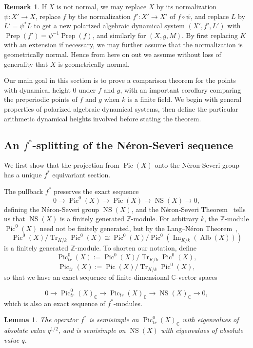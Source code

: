 \documentclass[times, doublespace]{amsart}
\numberwithin{equation}{section}
\theoremstyle{plain}
\newtheorem{lemma}[equation]{Lemma}
\theoremstyle{definition}
\newtheorem*{remark}{Remark}
\DeclareMathOperator{\Pic}{Pic}
\DeclareMathOperator{\NS}{NS}
\DeclareMathOperator{\Prep}{Prep}
\DeclareMathOperator{\Alb}{Alb}
\renewcommand{\Im}{\operatorname{Im}}
\newcommand{\Tr}{\operatorname{Tr}}
\newcommand{\trP}[1]{\operatorname{Pic}_{tr}(#1)}
\newcommand{\trPo}[1]{\operatorname{Pic}^0_{tr}(#1)}
\newcommand{\C}{\mathbb{C}}
\newcommand{\Z}{\mathbb{Z}}
\begin{document}
\begin{remark}
If $X$ is not normal, we may replace $X$ by its normalization $\psi:X'\to X$, replace $f$ by the normalization $f':X'\to X'$ of $f\circ \psi$, and replace $L$ by $L'=\psi^*L$ to get a new polarized algebraic dynamical system $(X',f',L')$ with $\Prep(f')=\psi^{-1}\Prep(f)$, and similarly for $(X,g,M)$. By first replacing $K$ with an extension if necessary, we may further assume that the normalization is geometrically normal. Hence from here on out we assume without loss of generality that $X$ is geometrically normal.
\end{remark}

Our main goal in this section is to prove a comparison theorem for the points with dynamical height 0 under $f$ and $g$, with an important corollary comparing the preperiodic points of $f$ and $g$ when $k$ is a finite field. We begin with general properties of polarized algebraic dynamical systems, then define the particular arithmetic dynamical heights involved before stating the theorem.



\subsection{An $f^*$-splitting of the N\'eron-Severi sequence}
We first show that the projection from $\Pic(X)$ onto the N\'eron-Severi group has a unique $f^*$ equivariant section.

The pullback $f^*$ preserves the exact sequence
\[0\longrightarrow\Pic^0(X)\longrightarrow\Pic(X)\longrightarrow\NS(X)\longrightarrow0,\]
defining the N\'eron-Severi group $\NS(X)$, and the N\'eron-Severi Theorem~\cite[Exp. XII, Thm 5.1, p. 650]{SGA6} tells us that $\NS(X)$ is a finitely generated $\Z$-module. For arbitrary $k$, the $\Z$-module $\Pic^0(X)$ need not be finitely generated, but by the Lang--N\'eron Theorem~\cite{langneron},
\[\Pic^0(X)\bigg/\Tr_{K/k}\Pic^0(X)\cong\Pic^0(X)\bigg/\Pic^0\left(\Im_{K/k}(\Alb(X))\right)\]
is a finitely generated $\Z$-module. 
To shorten our notation, define
\[\trPo{X}:=\Pic^0(X)\bigg/\Tr_{K/k}\Pic^0(X),\]
\[\trP{X}:=\Pic(X)\bigg/\Tr_{K/k}\Pic^0(X),\]
so that we have an exact sequence of finite-dimensional $\C$-vector spaces

\[0\longrightarrow\trPo{X}
_{\C}\longrightarrow\trP{X}
_{\C}\longrightarrow\NS(X)_{\C}\longrightarrow0,\]
which is also an exact sequence of $f^*$-modules.




\begin{lemma}\label{eigenvalues}
The operator $f^*$ is semisimple on $\trPo{X}_{\C}$ 
with eigenvalues of absolute value $q^{1/2}$, and is semisimple on $\NS(X)$ with eigenvalues of absolute value $q$.
\end{lemma}
\end{document}
